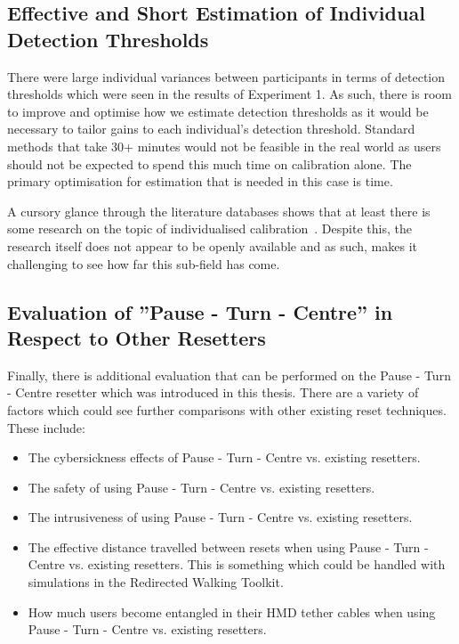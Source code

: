 \subsection{Effective and Short Estimation of Individual Detection Thresholds}   
There were large individual variances between participants in terms of detection thresholds which were seen in the results of Experiment 1. As such, there is room to improve and optimise how we estimate detection thresholds as it would be necessary to tailor gains to each individual's detection threshold. Standard methods that take 30+ minutes would not be feasible in the real world as users should not be expected to spend this much time on calibration alone. The primary optimisation for estimation that is needed in this case is time. 

A cursory glance through the literature databases shows that at least there is some research on the topic of individualised calibration~\cite{hutton2018individualized}. Despite this, the research itself does not appear to be openly available and as such, makes it challenging to see how far this sub-field has come. 

\subsection{Evaluation of ''Pause - Turn - Centre'' in Respect to Other Resetters}
Finally, there is additional evaluation that can be performed on the Pause - Turn - Centre resetter which was introduced in this thesis. There are a variety of factors which could see further comparisons with other existing reset techniques. These include:

\begin{itemize}
    \item The cybersickness effects of Pause - Turn - Centre vs. existing resetters.
    \item The safety of using Pause - Turn - Centre vs. existing resetters.
    \item The intrusiveness of using Pause - Turn - Centre vs. existing resetters.
    \item The effective distance travelled between resets when using Pause - Turn - Centre vs. existing resetters. This is something which could be handled with simulations in the Redirected Walking Toolkit. 
    \item How much users become entangled in their HMD tether cables when using Pause - Turn - Centre vs. existing resetters.
\end{itemize}
      
\iffalse
   * Having people's first experience with VR be with redirected walking
      * They might normalise the redirected walking elements
         * \todo{Will have to look deeper into the data on people with no experience and how many detections they did}

\subsection{Distractor Salience and Optical Flow}
* How does salience impact optical flow? How does this then impact the noticeability of redirection?
* Already covered by other sections I'd say
\fi